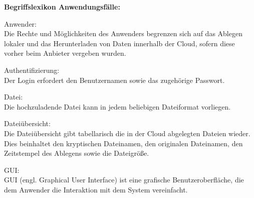 \documentclass[12pt,a4paper,bibliography=totocnumbered,listof=totocnumbered]{scrartcl}
\begin{document}
\textbf{Begriffslexikon Anwendungsfälle:}
\begin{compactitem}
\item Anwender:\\
Die Rechte und Möglichkeiten des Anwenders begrenzen sich auf das Ablegen lokaler und das Herunterladen von Daten innerhalb der Cloud, sofern diese vorher beim Anbieter vergeben wurden.
\item Authentifizierung:\\
Der Login erfordert den Benutzernamen sowie das zugehörige Passwort.
\item Datei:\\
Die hochzuladende Datei kann in jedem beliebigen Dateiformat vorliegen.
\item Dateiübersicht:\\
Die Dateiübersicht gibt tabellarisch die in der Cloud abgelegten Dateien wieder. Dies beinhaltet den kryptischen Dateinamen, den originalen Dateinamen, den Zeitstempel des Ablegens sowie die Dateigröße.
\item GUI:\\
GUI (engl. Graphical User Interface) ist eine grafische Benutzeroberfläche, die dem Anwender die Interaktion mit dem System vereinfacht.
\end{compactitem}
\end{document}
